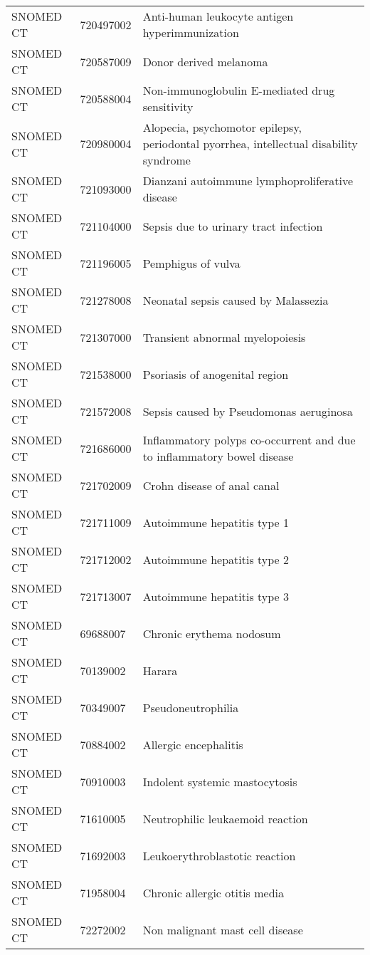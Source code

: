 \begin{longtable}{p{}p{}p{}}
  SNOMED CT & 720497002 & Anti-human leukocyte antigen hyperimmunization \\ 
  SNOMED CT & 720587009 & Donor derived melanoma \\ 
  SNOMED CT & 720588004 & Non-immunoglobulin E-mediated drug sensitivity \\ 
  SNOMED CT & 720980004 & Alopecia, psychomotor epilepsy, periodontal pyorrhea, intellectual disability syndrome \\ 
  SNOMED CT & 721093000 & Dianzani autoimmune lymphoproliferative disease \\ 
  SNOMED CT & 721104000 & Sepsis due to urinary tract infection \\ 
  SNOMED CT & 721196005 & Pemphigus of vulva \\ 
  SNOMED CT & 721278008 & Neonatal sepsis caused by Malassezia \\ 
  SNOMED CT & 721307000 & Transient abnormal myelopoiesis \\ 
  SNOMED CT & 721538000 & Psoriasis of anogenital region \\ 
  SNOMED CT & 721572008 & Sepsis caused by Pseudomonas aeruginosa \\ 
  SNOMED CT & 721686000 & Inflammatory polyps co-occurrent and due to inflammatory bowel disease \\ 
  SNOMED CT & 721702009 & Crohn disease of anal canal \\ 
  SNOMED CT & 721711009 & Autoimmune hepatitis type 1 \\ 
  SNOMED CT & 721712002 & Autoimmune hepatitis type 2 \\ 
  SNOMED CT & 721713007 & Autoimmune hepatitis type 3 \\ 
  SNOMED CT & 69688007 & Chronic erythema nodosum \\ 
  SNOMED CT & 70139002 & Harara \\ 
  SNOMED CT & 70349007 & Pseudoneutrophilia \\ 
  SNOMED CT & 70884002 & Allergic encephalitis \\ 
  SNOMED CT & 70910003 & Indolent systemic mastocytosis \\ 
  SNOMED CT & 71610005 & Neutrophilic leukaemoid reaction \\ 
  SNOMED CT & 71692003 & Leukoerythroblastotic reaction \\ 
  SNOMED CT & 71958004 & Chronic allergic otitis media \\ 
  SNOMED CT & 72272002 & Non malignant mast cell disease \\ 

\end{longtable}
